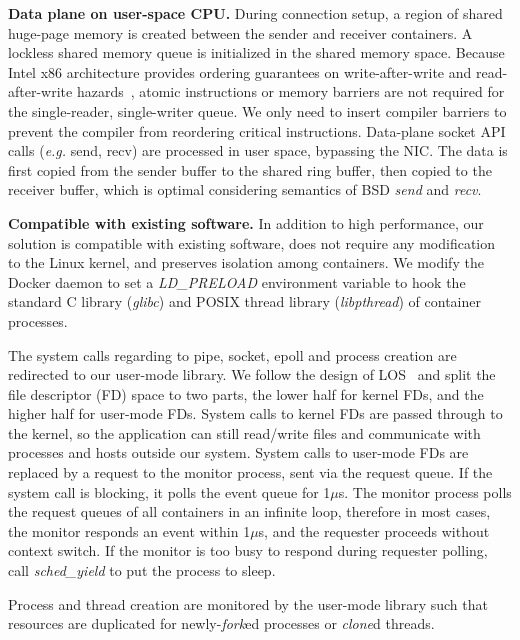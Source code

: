 \textbf{Data plane on user-space CPU.}
During connection setup, a region of shared huge-page memory is created between the sender and receiver containers.
A lockless shared memory queue is initialized in the shared memory space.
Because Intel x86 architecture provides ordering guarantees on write-after-write and read-after-write hazards~\cite{intel-manual}, atomic instructions or memory barriers are not required for the single-reader, single-writer queue. We only need to insert compiler barriers to prevent the compiler from reordering critical instructions.
Data-plane socket API calls (\textit{e.g.} send, recv) are processed in user space, bypassing the NIC.
The data is first copied from the sender buffer to the shared ring buffer, then copied to the receiver buffer, which is optimal considering semantics of BSD \textit{send} and \textit{recv}.


\textbf{Compatible with existing software.}
In addition to high performance, our solution is compatible with existing software, does not require any modification to the Linux kernel, and preserves isolation among containers.
We modify the Docker daemon to set a \textit{LD\_PRELOAD} environment variable to hook the standard C library (\textit{glibc}) and POSIX thread library (\textit{libpthread}) of container processes.

The system calls regarding to pipe, socket, epoll and process creation are redirected to our user-mode library.
We follow the design of LOS~\cite{huang2017high} and split the file descriptor (FD) space to two parts, the lower half for kernel FDs, and the higher half for user-mode FDs.
System calls to kernel FDs are passed through to the kernel, so the application can still read/write files and communicate with processes and hosts outside our system.
System calls to user-mode FDs are replaced by a request to the monitor process, sent via the request queue. If the system call is blocking, it polls the event queue for 1$\mu$s.
The monitor process polls the request queues of all containers in an infinite loop, therefore in most cases, the monitor responds an event within 1$\mu$s, and the requester proceeds without context switch. If the monitor is too busy to respond during requester polling, call \textit{sched\_yield} to put the process to sleep.

Process and thread creation are monitored by the user-mode library such that resources are duplicated for newly-\textit{fork}ed processes or \textit{clone}d threads.


